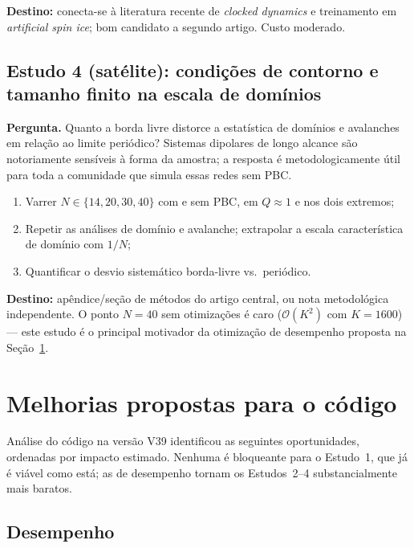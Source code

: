 \documentclass[11pt,a4paper]{article}
\begin{document}
\textbf{Destino:} conecta-se à literatura recente de \emph{clocked
dynamics} e treinamento em \emph{artificial spin ice}; bom candidato a
segundo artigo. Custo moderado.

\subsection{Estudo 4 (satélite): condições de contorno e tamanho finito
na escala de domínios}

\textbf{Pergunta.} Quanto a borda livre distorce a estatística de
domínios e avalanches em relação ao limite periódico? Sistemas dipolares
de longo alcance são notoriamente sensíveis à forma da amostra; a
resposta é metodologicamente útil para toda a comunidade que simula
essas redes sem PBC.

\begin{enumerate}
\item Varrer $N \in \{14, 20, 30, 40\}$ com e sem PBC, em $Q \approx 1$
e nos dois extremos;
\item Repetir as análises de domínio e avalanche; extrapolar a escala
característica de domínio com $1/N$;
\item Quantificar o desvio sistemático borda-livre vs.\ periódico.
\end{enumerate}

\textbf{Destino:} apêndice/seção de métodos do artigo central, ou nota
metodológica independente. O ponto $N = 40$ sem otimizações é caro
($\mathcal{O}(K^2)$ com $K = 1600$) --- este estudo é o principal
motivador da otimização de desempenho proposta na
Seção~\ref{sec:melhorias}.

\section{Melhorias propostas para o código}
\label{sec:melhorias}

Análise do código na versão V39 identificou as seguintes oportunidades,
ordenadas por impacto estimado. Nenhuma é bloqueante para o Estudo~1,
que já é viável como está; as de desempenho tornam os Estudos~2--4
substancialmente mais baratos.

\subsection{Desempenho}
\end{document}
